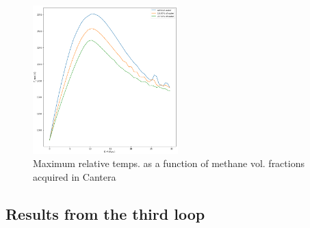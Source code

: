 \documentclass[a4paper]{article}
\begin{document}
\begin{figure}[h!]
\centering
\includegraphics[width=0.5\textwidth]{1_Tmax_to_CH4.png}
\caption{\label{fig:2_2rel}Maximum relative temps. as a function of methane vol. fractions acquired in Cantera}
\end{figure}
\subsection{Results from the third loop}
\end{document}
